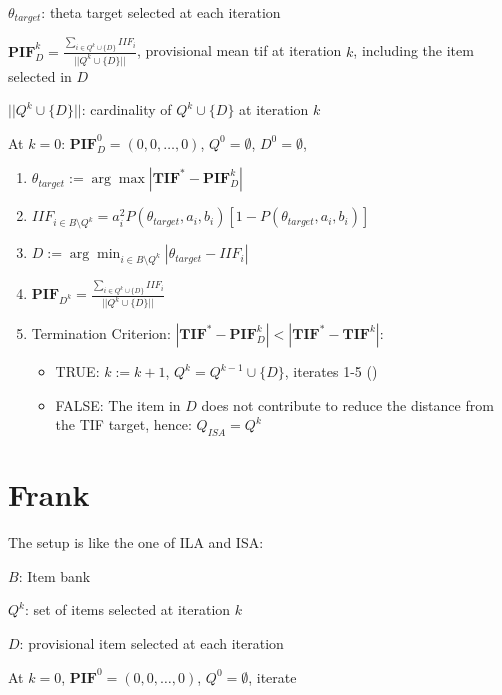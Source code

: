 \documentclass[12pt, a4paper, titilepage]{article}
\begin{document}
$\theta_{target}$: theta target selected at each iteration

$\mathbf{PIF}_D^k = \frac{\sum_{i\in Q^k \cup \{D\}} IIF_i}{||Q^k \cup \{D\}||}$, provisional mean tif at iteration $k$, including the item selected in $D$

$||Q^k \cup \{D\}||$: cardinality of $Q^k \cup \{D\}$ at iteration $k$

\normalcolor

At $k = 0$: $\mathbf{PIF}_D^0 = (0, 0, \ldots, 0)$, $Q^0 = \emptyset$, $D^0 = \emptyset$,

\begin{enumerate}
	\item $\theta_{target} := \arg \max |\mathbf{TIF}^* - \mathbf{PIF}_D^{k}|$
	\item $IIF_{i \in B \setminus Q^k} = a_i^2P(\theta_{target}, a_i, b_i)[1-P(\theta_{target}, a_i, b_i)]$
	\item $D := \arg \min_{i \in B\setminus Q^k} |\theta_{target} - IIF_i|$
	\item $\mathbf{PIF}_{D^k} = \frac{\sum_{i \in Q^k \cup \{D\}} IIF_i}{||Q^k \cup \{D\}||}$
	\item Termination Criterion: $|\mathbf{TIF}^* - \mathbf{PIF}_D^k| < |\mathbf{TIF}^* - \mathbf{TIF}^{k}|$: 
	\begin{itemize}
		\item TRUE: $k := k +1$, $Q^{k} = Q^{k-1} \cup \{D\}$, iterates 1-5 ()
		\item FALSE: The item in $D$ does not contribute to reduce the distance from the TIF target, hence: $Q_{ISA} = Q^k$
	\end{itemize}
\end{enumerate}



\section{Frank}


The setup is like the one of ILA and ISA: 

$B$: Item bank 

$Q^k$: set of items selected at iteration $k$

$D$: provisional item selected at each iteration


At $k =0$, $\mathbf{PIF}^0 = (0, 0, \ldots, 0)$, $Q^0 = \emptyset$, iterate
\end{document}
